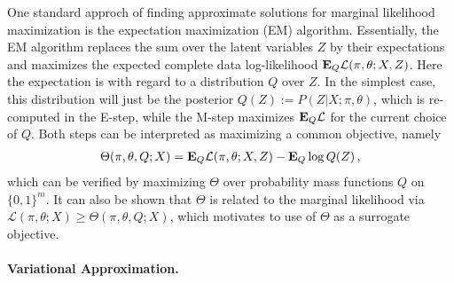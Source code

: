 \documentclass{article}
\newcommand{\E}{{\bf E}}
\newcommand{\loglike}{{\mathcal L}}
\begin{document}
One standard approch of finding approximate solutions for marginal likelihood maximization is the expectation maximization (EM) algorithm. Essentially, the EM algorithm replaces the sum over the latent variables $Z$ by their expectations and maximizes the expected complete data log-likelihood $\E_Q \loglike(\pi, \theta; X, Z)$. Here the expectation is with regard to a distribution $Q$ over $Z$. In the simplest case, this distribution will just be the posterior $Q(Z) := P(Z| X; \pi, \theta)$, which is re-computed in the E-step, while the M-step maximizes $\E_Q \loglike$ for the current choice of $Q$. Both steps can be interpreted as maximizing a common objective,
namely 
\begin{align}
\Theta(\pi, \theta, Q; X) = \E_Q \loglike(\pi,\theta; X, Z) - \E_Q \log Q(Z) \,,
\end{align}
which can be verified by maximizing $\Theta$ over probability mass functions $Q$ on $\{0,1\}^m$. It can also be shown that $\Theta$  is related to the marginal likelihood via $\loglike(\pi, \theta; X) \ge \Theta(\pi, \theta, Q; X)$, which motivates to use of $\Theta$ as a surrogate objective. 

\paragraph{Variational Approximation.}
\end{document}
